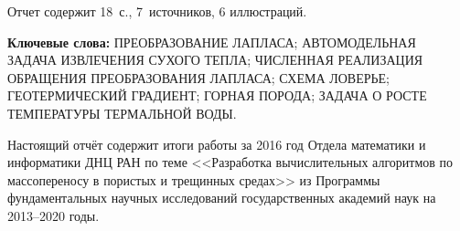 \Referat %

Отчет содержит 18~с., 7~источников, 6 иллюстраций.

 \bigskip
 \textbf{ Ключевые
  слова:}
  ПРЕОБРАЗОВАНИЕ ЛАПЛАСА; АВТОМОДЕЛЬНАЯ ЗАДАЧА ИЗВЛЕЧЕНИЯ СУХОГО ТЕПЛА; ЧИСЛЕННАЯ РЕАЛИЗАЦИЯ ОБРАЩЕНИЯ ПРЕОБРАЗОВАНИЯ ЛАПЛАСА; СХЕМА ЛОВЕРЬЕ; ГЕОТЕРМИЧЕСКИЙ ГРАДИЕНТ;
  ГОРНАЯ ПОРОДА; ЗАДАЧА О РОСТЕ ТЕМПЕРАТУРЫ ТЕРМАЛЬНОЙ ВОДЫ.

 \bigskip

Настоящий отчёт содержит итоги работы за 2016 год Отдела математики и информатики ДНЦ РАН по теме
<<Разработка вычислительных алгоритмов по массопереносу в пористых и трещинных средах>>
из Программы фундаментальных научных исследований государственных академий наук на 2013–2020 годы.




